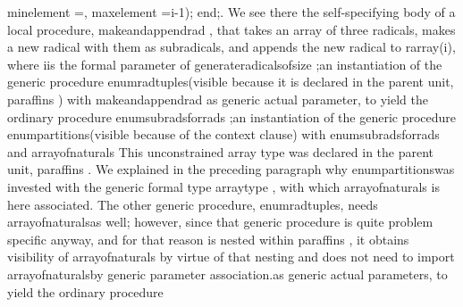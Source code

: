                              min\Symuns[]element     =,
                             max\Symuns[]element     =\Symgt[] i-1);
\tyxtstxbf[]end\tyxtstxendbf[];\Endcomp[]
\EndParbox[]
\FgEndblock[]
 . We see there
\LstList[]
\LstItem[]the self-specifying body of a local procedure, %
\tyxffmxmono[]make\Symuns[]and\Symuns[]append\Symuns[]rad%
\tyxffmxendmono[], that takes an array of three radicals, makes a
new radical with them as subradicals, and appends the new radical
to \tyxffmxmono[]r\Symuns[]array(i)\tyxffmxendmono[], where %
\tyxffmxmono[]i\tyxffmxendmono[] is the formal parameter of %
\tyxffmxmono[]generate\Symuns[]radicals\Symuns[]of\Symuns[]size%
\tyxffmxendmono[];\LstEnditem[]
\LstItem[]an instantiation of the generic procedure %
\tyxffmxmono[]enum\Symuns[]rad\Symuns[]tuples\tyxffmxendmono[] (visible
because it is declared in the parent unit, \tyxffmxmono[]paraffins%
\tyxffmxendmono[]) with \tyxffmxmono[]make\Symuns[]and\Symuns[]append\Symuns[]rad%
\tyxffmxendmono[] as generic actual parameter, to yield the ordinary
procedure \tyxffmxmono[]enum\Symuns[]sub\tyxdishyph[]rads\Symuns[]for\Symuns[]rads%
\tyxffmxendmono[];\LstEnditem[]
\LstItem[]an instantiation of the generic procedure %
\tyxffmxmono[]enum\Symuns[]partitions\tyxffmxendmono[] (visible because
of the context clause) with \tyxffmxmono[]enum\Symuns[]subrads\Symuns[]for\Symuns[]rads%
\tyxffmxendmono[] and \tyxffmxmono[]array\Symuns[]of\Symuns[]naturals%
\tyxffmxendmono[]\NtFoot[]\NtNtpar[]This unconstrained array type
was declared in the parent unit, \tyxffmxmono[]paraffins%
\tyxffmxendmono[]. We explained in the preceding paragraph why %
\tyxffmxmono[]enum\Symuns[]partitions\tyxffmxendmono[] was invested
with the generic formal type \tyxffmxmono[]array\Symuns[]type%
\tyxffmxendmono[], with which \tyxffmxmono[]array\Symuns[]of\Symuns[]naturals%
\tyxffmxendmono[] is here associated. The other generic procedure,
\tyxffmxmono[]enum\Symuns[]rad\Symuns[]tuples\tyxffmxendmono[], needs
\tyxffmxmono[]array\Symuns[]of\Symuns[]naturals\tyxffmxendmono[] as
well; however, since that generic procedure is quite problem specific
anyway, and for that reason is nested within \tyxffmxmono[]paraffins%
\tyxffmxendmono[], it obtains visibility of \tyxffmxmono[]array\Symuns[]of\Symuns[]naturals%
\tyxffmxendmono[] by virtue of that nesting and does not need to import
\tyxffmxmono[]array\Symuns[]of\Symuns[]naturals\tyxffmxendmono[] by
generic parameter association.\NtEndntpar[]\NtEndfoot[] as generic
actual parameters, to yield the ordinary procedure %
